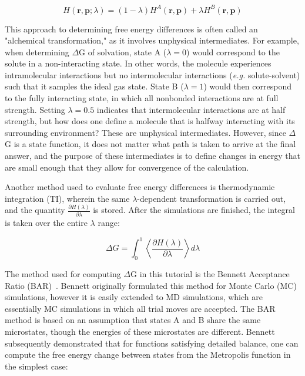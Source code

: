 \documentclass[9pt,tutorial,pubversion]{livecoms}
\begin{document}
\begin{equation} \label{vdw_hamiltonian_eq}
H(\mathbf{r},\mathbf{p};\lambda) = (1 - \lambda) H^A(\mathbf{r},\mathbf{p}) + \lambda H^B(\mathbf{r},\mathbf{p})
\end{equation}

This approach to determining free energy differences is often called an "alchemical transformation," as it involves unphysical intermediates. For example, when determining $\Delta$G of solvation, state A ($\lambda = 0$) would correspond to the solute in a non-interacting state. In other words, the molecule experiences intramolecular interactions but no intermolecular interactions ({\em e.g.} solute-solvent) such that it samples the ideal gas state. State B ($\lambda = 1$) would then correspond to the fully interacting state, in which all nonbonded interactions are at full strength. Setting $\lambda = 0.5$ indicates that intermolecular interactions are at half strength, but how does one define a molecule that is halfway interacting with its surrounding environment? These are unphysical intermediates. However, since $\Delta$G is a state function, it does not matter what path is taken to arrive at the final answer, and the purpose of these intermediates is to define changes in energy that are small enough that they allow for convergence of the calculation.

Another method used to evaluate free energy differences is thermodynamic integration (TI), wherein the same $\lambda$-dependent transformation is carried out, and the quantity $\frac{\partial H(\lambda)}{\partial \lambda}$ is stored. After the simulations are finished, the integral is taken over the entire $\lambda$ range:

\begin{equation} \label{ti_eq}
\Delta G = \int_{0}^{1} \left\langle \frac{\partial H(\lambda)}{\partial \lambda} \right\rangle d\lambda
\end{equation}

The method used for computing $\Delta$G in this tutorial is the Bennett Acceptance Ratio (BAR)~\cite{Bennett1976}. Bennett originally formulated this method for Monte Carlo (MC) simulations, however it is easily extended to MD simulations, which are essentially MC simulations in which all trial moves are accepted. The BAR method is based on an assumption that states A and B share the same microstates, though the energies of these microstates are different. Bennett subsequently demonstrated that for functions satisfying detailed balance, one can compute the free energy change between states from the Metropolis function in the simplest case:
\end{document}
